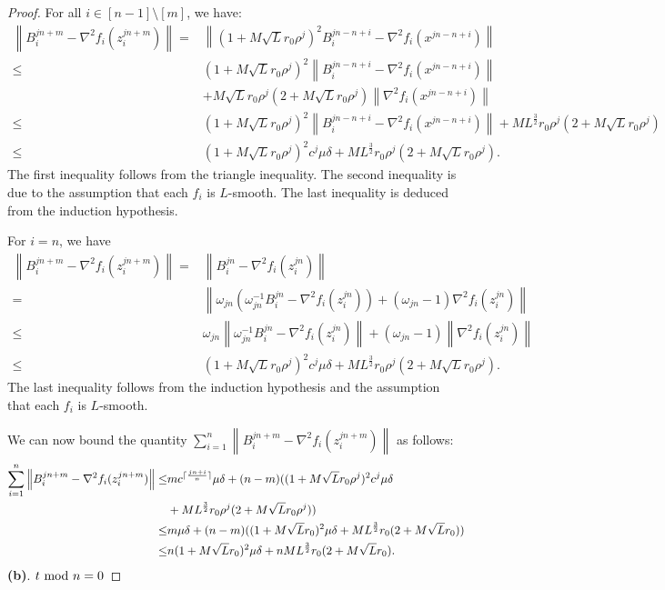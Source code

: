 \documentclass[letterpaper]{article} %
\theoremstyle{plain}
\theoremstyle{definition}
\theoremstyle{remark}
\DeclarePairedDelimiter\ceil{\lceil}{\rceil}
\newcommand\norm[1]{\left\lVert#1\right\rVert}
\begin{document}
\begin{proof}
    For all $i \in [n-1] \setminus [m]$, we have:
    \begin{align*}
        \norm{B_i^{j n + m} - \nabla^2 f_i (z_i^{j n + m})} = & \norm{(1 + M\sqrt{L} r_0 \rho^j)^2 B_i^{j n - n + i} - \nabla^2 f_i(x^{j n - n + i})} \\
        \leq & (1 + M \sqrt{L} r_0 \rho^j)^2 \norm{B_i^{j n - n + i} - \nabla^2 f_i (x^{j n - n + i})} \\ 
        & + M \sqrt{L} r_0 \rho^j (2 + M \sqrt{L} r_0 \rho^j) \norm{\nabla^2 f_i(x^{j n - n + i})} \\
        \leq & (1 + M \sqrt{L} r_0 \rho^j)^2 \norm{B_i^{j n - n + i} - \nabla^2 f_i (x^{j n - n + i})} + M L^{\frac{3}{2}} r_0 \rho^j (2 + M \sqrt{L} r_0 \rho^j)  \\
        \leq & (1 + M \sqrt{L} r_0 \rho^j)^2 c^j \mu \delta + M L^{\frac{3}{2}} r_0 \rho^j (2 + M \sqrt{L} r_0 \rho^j).
    \end{align*}
    The first inequality follows from the triangle inequality. The second inequality is due to the assumption that each $f_i$ is $L$-smooth. The last inequality is deduced from the induction hypothesis.
    
    For $i = n$, we have 
    \begin{align*}
        \norm{B_{i}^{j n + m} - \nabla^2 f_i (z_i^{j n + m})} = & \norm{B_i^{j n} - \nabla^2 f_i (z_i^{j n})} \\
         = & \norm{ \omega_{j n} (\omega_{j n}^{-1} B_i^{j n} - \nabla^2 f_i (z_i^{j n})) + (\omega_{j n} - 1) \nabla^2 f_i (z_i^{j n})} \\
         \leq & \omega_{j n} \norm{  \omega_{j n}^{-1} B_i^{j n} - \nabla^2 f_i (z_i^{j n})} + (\omega_{j n} - 1) \norm{ \nabla^2 f_i (z_i^{j n})} \\
         \leq & (1 + M \sqrt{L} r_0 \rho^j)^2 c^j \mu \delta + M L^{\frac{3}{2}} r_0 \rho^j (2 + M \sqrt{L} r_0 \rho^j).
    \end{align*}
    The last inequality follows from the induction hypothesis and the assumption that each $f_i$ is $L$-smooth.

    We can now bound the quantity $\sum_{i=1}^n \norm{B_i^{j n + m} - \nabla^2 f_i(z_i^{j n + m})}$ as follows:
    \begin{equation}
    \begin{split}
        \sum_{i=1}^n \norm{B_i^{j n + m} - \nabla^2 f_i(z_i^{j n + m})} \leq & m c^{\ceil{\frac{j n + i}{n}}}\mu \delta + (n - m) ((1 + M \sqrt{L} r_0 \rho^j)^2 c^j \mu \delta \\ 
        & + M L^{\frac{3}{2}} r_0 \rho^j (2 + M \sqrt{L} r_0 \rho^j)) \\
        \leq & m \mu \delta + (n - m) ((1 + M \sqrt{L} r_0 )^2 \mu \delta  + M L^{\frac{3}{2}} r_0  (2 + M \sqrt{L} r_0 )) \\
        \leq & n (1 + M \sqrt{L} r_0 )^2 \mu \delta + n  M L^{\frac{3}{2}} r_0  (2 + M \sqrt{L} r_0 ).
    \end{split}
    \label{eq:matrix_diff_1}
    \end{equation}
    \textbf{(b)}. $t~{\rm mod}~n = 0$


\end{proof}
\end{document}
